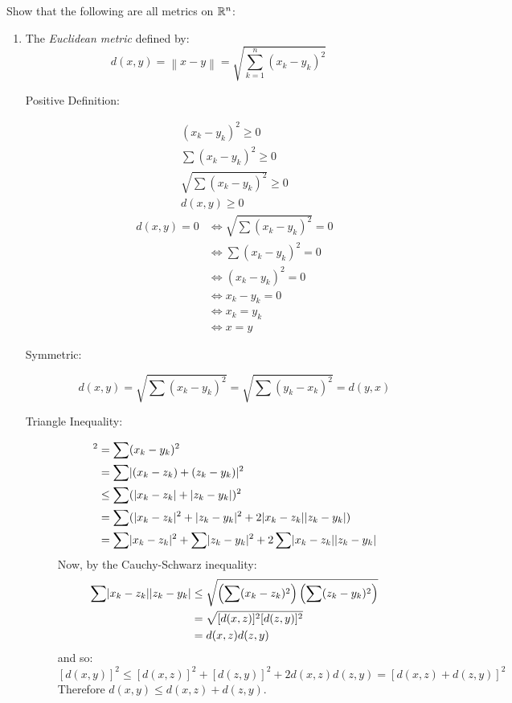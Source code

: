 \documentclass[letterpaper,12pt,fleqn]{article}
\newcommand{\norm}[1]{\left\lVert{#1}\right\rVert}
\begin{document}
\begin{examples}[Exercise 9.1]
  Show that the following are all metrics on \(\mathbb{R}^n\):
  \begin{enumerate}
  \item The \emph{Euclidean metric} defined by:
    \[d(x,y)=\norm{x-y}=\sqrt{\sum_{k=1}^n(x_k-y_k)^2}\]

    \begin{description}
    \item[Positive Definition:]
      \begin{gather*}
        (x_k-y_k)^2\ge0 \\
        \sum(x_k-y_k)^2\ge0 \\
        \sqrt{\sum(x_k-y_k)^2}\ge0 \\
        d(x,y)\ge0
      \end{gather*}
      \begin{align*}
        d(x,y)=0 &\iff \sqrt{\sum(x_k-y_k)^2}=0 \\
        &\iff \sum(x_k-y_k)^2=0 \\
        &\iff (x_k-y_k)^2=0 \\
        &\iff x_k-y_k=0 \\
        &\iff x_k=y_k \\
        &\iff x=y
      \end{align*}
    \item[Symmetric:]
      \[d(x,y)=\sqrt{\sum(x_k-y_k)^2}=\sqrt{\sum(y_k-x_k)^2}=d(y,x)\]
    \item[Triangle Inequality:]
      \begin{align*}
        [d(x,y)]^2 &= \sum(x_k-y_k)^2 \\
        &= \sum\abs{(x_k-z_k)+(z_k-y_k)}^2 \\
        &\le \sum(\abs{x_k-z_k}+\abs{z_k-y_k})^2 \\
        &= \sum(\abs{x_k-z_k}^2+\abs{z_k-y_k}^2+2\abs{x_k-z_k}\abs{z_k-y_k}) \\
        &= \sum\abs{x_k-z_k}^2+\sum\abs{z_k-y_k}^2+2\sum\abs{x_k-z_k}\abs{z_k-y_k}
      \end{align*}
      Now, by the Cauchy-Schwarz inequality:
      \begin{align*}
        \sum\lvert x_k-z_k\rvert\lvert z_k-y_k\rvert &\le \sqrt{\left(\sum(x_k-z_k)^2\right)\left(\sum(z_k-y_k)^2\right)} \\
        &= \sqrt{[d(x,z)]^2[d(z,y)]^2} \\
        &= d(x,z)d(z,y)
      \end{align*}
      and so:
      \[[d(x,y)]^2\le[d(x,z)]^2+[d(z,y)]^2+2d(x,z)d(z,y)=[d(x,z)+d(z,y)]^2\]
      Therefore \(d(x,y)\le d(x,z)+d(z,y)\).
    \end{description}


\end{enumerate}
\end{examples}
\end{document}

